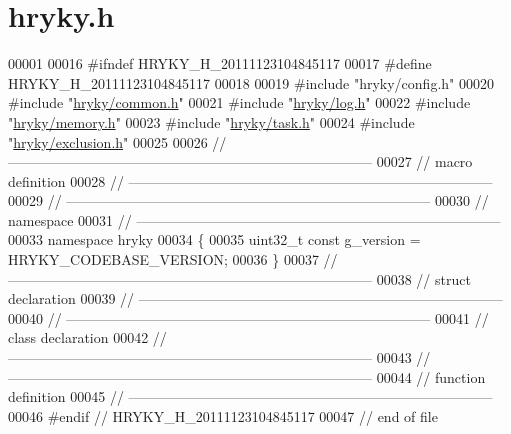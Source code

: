 \hypertarget{hryky_8h_source}{\section{hryky.\-h}
}

\begin{DoxyCode}
00001 
00016 \textcolor{preprocessor}{#ifndef HRYKY\_H\_20111123104845117}
00017 \textcolor{preprocessor}{}\textcolor{preprocessor}{#define HRYKY\_H\_20111123104845117}
00018 \textcolor{preprocessor}{}
00019 \textcolor{preprocessor}{#include "hryky/config.h"}
00020 \textcolor{preprocessor}{#include "\hyperlink{common_8h}{hryky/common.h}"}
00021 \textcolor{preprocessor}{#include "\hyperlink{log_8h}{hryky/log.h}"}
00022 \textcolor{preprocessor}{#include "\hyperlink{memory_8h}{hryky/memory.h}"}
00023 \textcolor{preprocessor}{#include "\hyperlink{task_8h}{hryky/task.h}"}
00024 \textcolor{preprocessor}{#include "\hyperlink{exclusion_8h}{hryky/exclusion.h}"}
00025 
00026 \textcolor{comment}{//
      ------------------------------------------------------------------------------}
00027 \textcolor{comment}{// macro definition}
00028 \textcolor{comment}{//
      ------------------------------------------------------------------------------}
00029 \textcolor{comment}{//
      ------------------------------------------------------------------------------}
00030 \textcolor{comment}{// namespace}
00031 \textcolor{comment}{//
      ------------------------------------------------------------------------------}
00033 \textcolor{comment}{}\textcolor{keyword}{namespace }hryky
00034 \{
00035     uint32\_t \textcolor{keyword}{const} g\_version = HRYKY\_CODEBASE\_VERSION;
00036 \}
00037 \textcolor{comment}{//
      ------------------------------------------------------------------------------}
00038 \textcolor{comment}{// struct declaration}
00039 \textcolor{comment}{//
      ------------------------------------------------------------------------------}
00040 \textcolor{comment}{//
      ------------------------------------------------------------------------------}
00041 \textcolor{comment}{// class declaration}
00042 \textcolor{comment}{//
      ------------------------------------------------------------------------------}
00043 \textcolor{comment}{//
      ------------------------------------------------------------------------------}
00044 \textcolor{comment}{// function definition}
00045 \textcolor{comment}{//
      ------------------------------------------------------------------------------}
00046 \textcolor{preprocessor}{#endif // HRYKY\_H\_20111123104845117}
00047 \textcolor{preprocessor}{}\textcolor{comment}{// end of file}
\end{DoxyCode}

